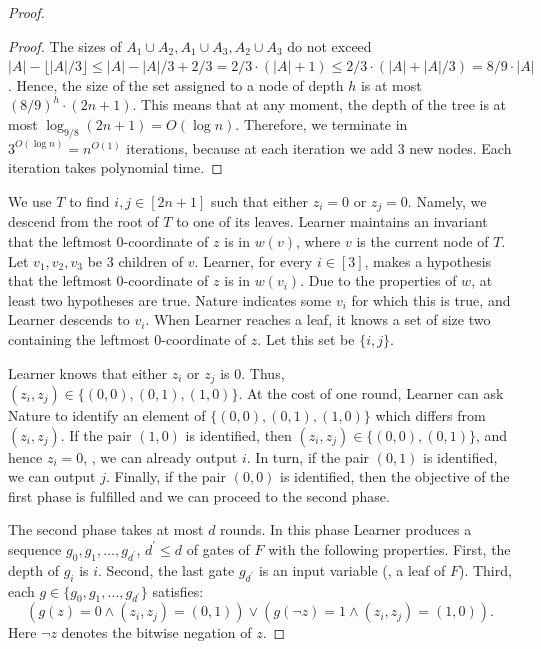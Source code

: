 \documentclass{toc}
\begin{document}
\begin{proof}
\begin{proof}
The sizes of $A_1\cup A_2, A_1 \cup A_3, A_2 \cup A_3$ do not exceed $|A| - \lfloor |A|/3\rfloor \le |A| - |A|/3 + 2/3 = 2/3 \cdot(|A| + 1) \le 2/3 \cdot(|A| + |A|/3) = 8/9\cdot |A|$. Hence, the size of the set assigned to a node of depth $h$ is at most $\left(8/9\right)^h \cdot (2n + 1)$.  This means that at any moment, the depth of the tree is at most $\log_{9/8}(2n + 1) = O(\log n)$. Therefore, we terminate in $3^{O(\log n)} = n^{O(1)}$ iterations, because at each iteration we add $3$ new nodes. Each iteration takes polynomial time.  
\end{proof}

We use $T$ to find %
%
%
$i, j\in [2n + 1]$ such that either $z_i = 0$ or $z_j = 0$. Namely, we descend from the root of $T$ to one of its 
%
leaves.  %
Learner maintains an invariant that the leftmost $0$-coordinate of $z$ is in $w(v)$, where $v$ is the current node of $T$. Let $v_1, v_2, v_3$ be $3$ children of $v$. Learner, for every $i\in [3]$, makes a hypothesis that the leftmost $0$-coordinate of $z$ is in $w(v_i)$. Due to the properties of $w$, at least two hypotheses are true. Nature indicates some $v_i$ for which this is true, and Learner descends to $v_i$. When Learner reaches a leaf, it 
%
knows a set of size two containing the leftmost $0$-coordinate of $z$. 
Let this set be $\{i,j\}$. 





Learner knows that either $z_i$ or $z_j$ is $0$. Thus, $(z_i,z_j) \in\{(0,0), (0,1), (1,0)\}$. At the cost of one round,
%
Learner %
can ask Nature to identify an element of $\{(0,0), (0,1), (1,0)\}$ which differs from $(z_i,z_j)$. If the pair $(1,0)$ is identified, then $(z_i,z_j) \in \{(0,0), (0,1)\}$, and hence $z_i = 0$, \ie, we can already output $i$. In turn, if the pair $(0,1)$ is identified, we can output $j$. Finally, if the pair $(0,0)$ is identified, then the objective of the first phase is fulfilled and we can proceed to the second phase.

The second phase takes at most $d$ rounds. In this phase Learner produces a sequence $g_0, g_1, \ldots, g_{d^\prime}$, $d^\prime \le d$ of gates of $F$ with the following properties. First, the depth of $g_i$ is $i$. Second, the last gate $g_{d^\prime}$ is an input variable (\ie, a leaf of $F$). Third, each $g\in\{g_0, g_1, \ldots, g_{d^\prime}\}$ satisfies:
\begin{equation}
\label{maj_invariant}
\left(g(z) = 0 \land (z_i,z_j) = (0,1) \right) \lor \left( g(\lnot z)  = 1 \land (z_i,z_j) = (1,0)\right).
\end{equation}
Here $\lnot z$ denotes the %
bitwise  %
negation of $z$. 


\end{proof}
\end{document}

